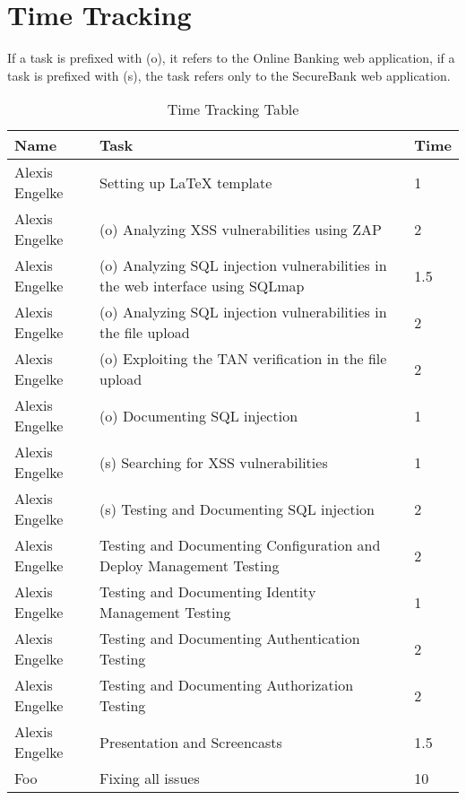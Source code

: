 \chapter{Time Tracking}\label{chapter:times}

If a task is prefixed with (o), it refers to the Online Banking web application, if a task is prefixed with (s), the task refers only to the SecureBank web application.

\begin{table}[htpb]
  \caption[Time Tracking Table]{Time Tracking Table}\label{tab:times}
  \centering
  \begin{tabular}{l p{8cm} l}
    \toprule
      Name & Task & Time \\
    \midrule
      Alexis Engelke & Setting up LaTeX template & 1 \\
      Alexis Engelke & (o) Analyzing XSS vulnerabilities using ZAP & 2 \\
      Alexis Engelke & (o) Analyzing SQL injection vulnerabilities in the web interface using SQLmap & 1.5 \\
      Alexis Engelke & (o) Analyzing SQL injection vulnerabilities in the file upload & 2 \\
      Alexis Engelke & (o) Exploiting the TAN verification in the file upload & 2 \\
      Alexis Engelke & (o) Documenting SQL injection & 1 \\
      Alexis Engelke & (s) Searching for XSS vulnerabilities & 1 \\
      Alexis Engelke & (s) Testing and Documenting SQL injection & 2 \\
      Alexis Engelke & Testing and Documenting Configuration and Deploy Management Testing & 2 \\
      Alexis Engelke & Testing and Documenting Identity Management Testing & 1 \\
      Alexis Engelke & Testing and Documenting Authentication Testing & 2 \\
      Alexis Engelke & Testing and Documenting Authorization Testing & 2 \\
      Alexis Engelke & Presentation and Screencasts & 1.5 \\
      Foo & Fixing all issues & 10 \\
    \bottomrule
  \end{tabular}
\end{table}
